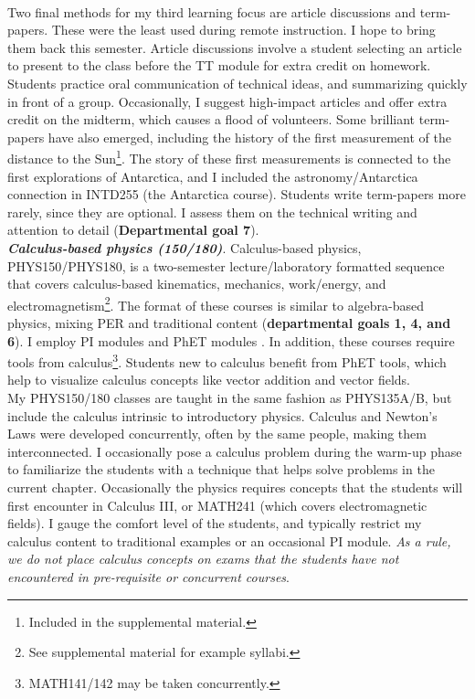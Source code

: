 \documentclass[../../../main.tex]{subfiles}
\begin{document}
\\
\vspace{0.25cm}
Two final methods for my third learning focus are article discussions and term-papers.  These were the least used during remote instruction.  I hope to bring them back this semester.  Article discussions involve a student selecting an article to present to the class before the TT module for extra credit on homework.  Students practice oral communication of technical ideas, and summarizing quickly in front of a group.  Occasionally, I suggest high-impact articles and offer extra credit on the midterm, which causes a flood of volunteers.  Some brilliant term-papers have also emerged, including the history of the first measurement of the distance to the Sun\footnote{Included in the supplemental material.}.  The story of these first measurements is connected to the first explorations of Antarctica, and I included the astronomy/Antarctica connection in INTD255 (the Antarctica course).  Students write term-papers more rarely, since they are optional.  I assess them on the technical writing and attention to detail (\textbf{Departmental goal 7}).
\\
\vspace{0.25cm}
\textbf{\textit{Calculus-based physics (150/180)}}. Calculus-based physics, PHYS150/PHYS180, is a two-semester lecture/laboratory formatted sequence that covers calculus-based kinematics, mechanics, work/energy, and electromagnetism\footnote{See supplemental material for example syllabi.}.  The format of these courses is similar to algebra-based physics, mixing PER and traditional content (\textbf{departmental goals 1, 4, and 6}).  I employ PI modules \cite{mazur2013peer} and PhET modules \cite{phet}.  In addition, these courses require tools from calculus\footnote{MATH141/142 may be taken concurrently.}.  Students new to calculus benefit from PhET tools, which help to visualize calculus concepts like vector addition and vector fields.
\\
\vspace{0.25cm}
My PHYS150/180 classes are taught in the same fashion as PHYS135A/B, but include the calculus intrinsic to introductory physics.  Calculus and Newton's Laws were developed concurrently, often by the same people, making them interconnected.  I occasionally pose a calculus problem during the warm-up phase to familiarize the students with a technique that helps solve problems in the current chapter.  Occasionally the physics requires concepts that the students will first encounter in Calculus III, or MATH241 (which covers electromagnetic fields).  I gauge the comfort level of the students, and typically restrict my calculus content to traditional examples or an occasional PI module.  \textit{As a rule, we do not place calculus concepts on exams that the students have not encountered in pre-requisite or concurrent courses}.
\end{document}
